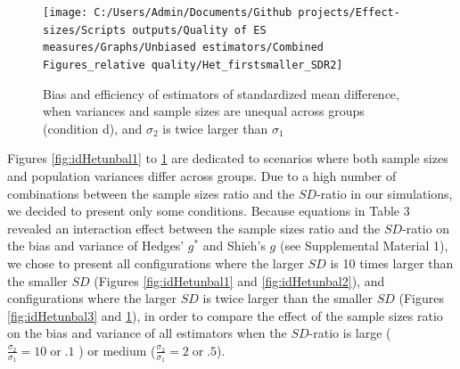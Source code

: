 \documentclass[
  english,
  man]{apa6}
\begin{document}
\begin{figure}

{\centering \texttt{[image: C:/Users/Admin/Documents/Github projects/Effect-sizes/Scripts outputs/Quality of ES measures/Graphs/Unbiased estimators/Combined Figures\_relative quality/Het\_firstsmaller\_SDR2]} 

}

\caption{Bias and efficiency of estimators of standardized mean difference, when variances and sample sizes are unequal across groups (condition d), and $\sigma_2$ is twice larger than $\sigma_1$}\label{fig:idHetunbal4}
\end{figure}
\newpage

Figures \ref{fig:idHetunbal1} to \ref{fig:idHetunbal4} are dedicated to scenarios where both sample sizes and population variances differ across groups. Due to a high number of combinations between the sample sizes ratio and the \(SD\)-ratio in our simulations, we decided to present only some conditions. Because equations in Table 3 revealed an interaction effect between the sample sizes ratio and the \(SD\)-ratio on the bias and variance of Hedges' \(g^*\) and Shieh's \(g\) (see Supplemental Material 1), we chose to present all configurations where the larger \(SD\) is 10 times larger than the smaller \(SD\) (Figures \ref{fig:idHetunbal1} and \ref{fig:idHetunbal2}), and configurations where the larger \(SD\) is twice larger than the smaller \(SD\) (Figures \ref{fig:idHetunbal3} and \ref{fig:idHetunbal4}), in order to compare the effect of the sample sizes ratio on the bias and variance of all estimators when the \(SD\)-ratio is large (\(\frac{\sigma_2}{\sigma_1}=10 \; \mathrm{or} \; .1\) ) or medium (\(\frac{\sigma_2}{\sigma_1}=2 \; \mathrm{or} \; .5\)).
\end{document}

